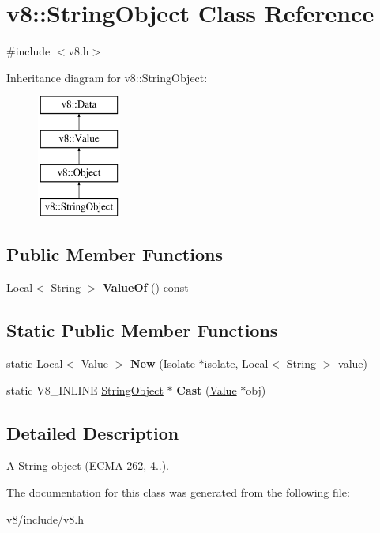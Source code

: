 \hypertarget{classv8_1_1StringObject}{}\section{v8\+:\+:String\+Object Class Reference}
\label{classv8_1_1StringObject}


{\ttfamily \#include $<$v8.\+h$>$}

Inheritance diagram for v8\+:\+:String\+Object\+:\begin{figure}[H]
\begin{center}
\leavevmode
\includegraphics[height=4.000000cm]{classv8_1_1StringObject}
\end{center}
\end{figure}
\subsection*{Public Member Functions}
\begin{DoxyCompactItemize}
\item 
\mbox{\label{classv8_1_1StringObject_a728454fbe6e41dc3af72de0f72ffe371}} 
\mbox{\hyperlink{classv8_1_1Local}{Local}}$<$ \mbox{\hyperlink{classv8_1_1String}{String}} $>$ {\bfseries Value\+Of} () const
\end{DoxyCompactItemize}
\subsection*{Static Public Member Functions}
\begin{DoxyCompactItemize}
\item 
\mbox{\label{classv8_1_1StringObject_a850b39ef363a85cd409dc31cd8ae7cfd}} 
static \mbox{\hyperlink{classv8_1_1Local}{Local}}$<$ \mbox{\hyperlink{classv8_1_1Value}{Value}} $>$ {\bfseries New} (Isolate $\ast$isolate, \mbox{\hyperlink{classv8_1_1Local}{Local}}$<$ \mbox{\hyperlink{classv8_1_1String}{String}} $>$ value)
\item 
\mbox{\label{classv8_1_1StringObject_af01249353a4a9032f7791a6e7a4ff094}} 
static V8\+\_\+\+I\+N\+L\+I\+NE \mbox{\hyperlink{classv8_1_1StringObject}{String\+Object}} $\ast$ {\bfseries Cast} (\mbox{\hyperlink{classv8_1_1Value}{Value}} $\ast$obj)
\end{DoxyCompactItemize}


\subsection{Detailed Description}
A \mbox{\hyperlink{classv8_1_1String}{String}} object (E\+C\+M\+A-\/262, 4..). 

The documentation for this class was generated from the following file\+:\begin{DoxyCompactItemize}
\item 
v8/include/v8.\+h\end{DoxyCompactItemize}
